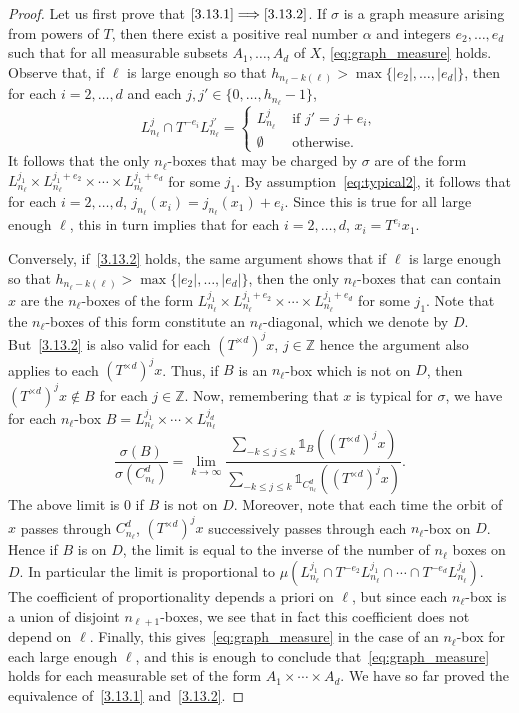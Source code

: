 \documentclass[10pt]{amsart}
\theoremstyle{definition}\newtheorem{defi}[theo]{Definition}\newtheorem{rema}[theo]{Remark}\newtheorem{exam}[theo]{Example}\newtheorem{exem}[theo]{Example}\newtheorem{nota}[theo]{Notation}
\newcommand{\ind}[1]{\mathds{1}_{#1}}
\newcommand{\ZZ}{\mathbb{Z}}
\newcommand{\cd}{C^{d}}
\newcommand{\td}{T^{\times d}}
\begin{document}
\begin{proof}
Let us first prove that $\eqref{3.13.1}\Longrightarrow\eqref{3.13.2}$. If $\sigma$ is a graph measure arising from powers of $T$, then there exist a positive real number $\alpha$ and integers $e_2,\ldots,e_d$ such that for all measurable subsets $A_1,\ldots,A_d$ of $X$, \eqref{eq:graph_measure} holds. Observe that, if $\ell$ is large enough so that $h_{n_\ell - k(\ell)} > \max\{|e_2|,\ldots,|e_d|\}$, then for each $i=2,\ldots,d$ and each $j,j'\in\{0,\ldots,h_{n_\ell}-1\}$,
\[
L_{n_\ell}^j \cap T^{-e_i}L_{n_\ell}^{j'}=
\begin{cases}
L_{n_\ell}^j &\text{ if }j'=j+e_i,\\
\emptyset &\text{ otherwise}.
\end{cases}
\]
It follows that the only $n_\ell$-boxes that may be charged by $\sigma$ are of the form $L_{n_\ell}^{j_1}\times L_{n_\ell}^{j_1+e_2}\times \cdots \times L_{n_\ell}^{j_1+e_d}$ for some $j_1$. By assumption~\eqref{eq:typical2}, it follows that for each $i=2,\ldots,d$, $j_{n_\ell}(x_i)= j_{n_\ell}(x_1)+e_i$. Since this is true for all large enough $\ell$, this in turn implies that for each $i=2,\ldots,d$, $x_i=T^{e_i}x_1$.

Conversely, if~\eqref{3.13.2} holds, the same argument shows that if $\ell$ is large enough so that $h_{n_\ell - k(\ell)} > \max\{|e_2|,\ldots,|e_d|\}$, then the only $n_\ell$-boxes that can contain $x$ are the $n_\ell$-boxes of the form $L_{n_\ell}^{j_1}\times L_{n_\ell}^{j_1+e_2}\times \cdots \times L_{n_\ell}^{j_1+e_d}$ for some $j_1$. Note that the $n_\ell$-boxes of this form constitute an $n_\ell$-diagonal, which we denote by $D$. But~\eqref{3.13.2} is also valid for each $(\td)^jx$, $j\in\ZZ$ hence the argument also applies to each $(\td)^jx$. Thus, if $B$ is an $n_\ell$-box which is not on $D$, then $(\td)^jx\notin B$ for each $j\in\ZZ$. Now, remembering that $x$ is typical for $\sigma$, we have for each $n_\ell$-box $B=L_{n_\ell}^{j_1}\times\cdots\times L_{n_\ell}^{j_d}$
\[
\dfrac{\sigma(B)}{\sigma(\cd_{n_\ell})} = \lim_{k\to\infty} \dfrac{\sum_{-k\le j\le k}\ind{B}((\td)^jx)}{\sum_{-k\le j\le k}\ind{\cd_{n_\ell}}((\td)^jx)}.
\]
The above limit is 0 if $B$ is not on $D$. Moreover, note that each time the orbit of $x$ passes through $\cd_{n_\ell}$, $(\td)^jx$ successively passes through each $n_\ell$-box on $D$. Hence if $B$ is on $D$, the limit is equal to the inverse of the number of $n_\ell$ boxes on $D$. In particular the limit is proportional to $\mu\left(L_{n_\ell}^{j_1}\cap T^{-e_2}L_{n_\ell}^{j_1}\cap\cdots\cap T^{-e_d}L_{n_\ell}^{j_d}\right)$. The coefficient of proportionality depends a priori on $\ell$, but since each $n_\ell$-box is a union of disjoint $n_{\ell+1}$-boxes, we see that in fact this coefficient does not depend on $\ell$. Finally, this gives~\eqref{eq:graph_measure} in the case of an $n_\ell$-box for each large enough $\ell$, and this is enough to conclude that~\eqref{eq:graph_measure} holds for each measurable set of the form $A_1\times\cdots\times A_d$. We have so far proved the equivalence of~\eqref{3.13.1} and~\eqref{3.13.2}.


\end{proof}
\end{document}
